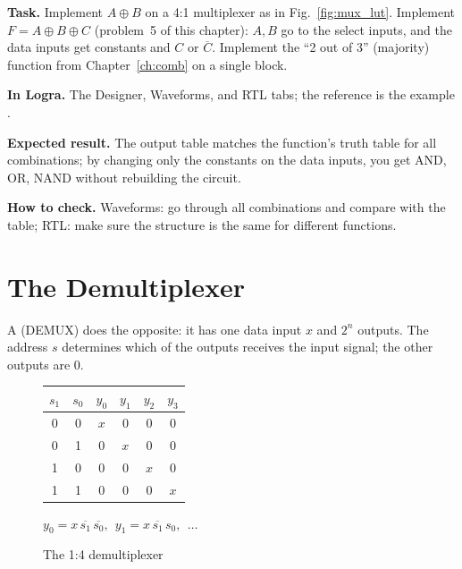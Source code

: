 \begin{diybox}
\textbf{Task.}  Implement $A\oplus B$ on a 4:1 multiplexer as in
Fig.~\ref{fig:mux_lut}.  Implement $F=A\oplus B\oplus C$ (problem~5 of
this chapter): $A,B$ go to the select inputs, and the data inputs get constants
and $C$ or $\overline{C}$.  Implement the ``2 out of 3'' (majority)
function from Chapter~\ref{ch:comb} on a single block.

\textbf{In Logra.} The Designer, Waveforms, and RTL tabs; the reference is the
example .

\textbf{Expected result.} The output table matches the function's truth table
for all combinations; by changing only the constants on the data inputs, you get
AND, OR, NAND without rebuilding the circuit.

\textbf{How to check.} Waveforms: go through all combinations and compare with
the table; RTL: make sure the structure is the same for different functions.
\end{diybox}

\section{The Demultiplexer}

A  (DEMUX) does the opposite: it has one data input $x$ and
$2^n$ outputs. The address $s$ determines which of the outputs receives the
input signal; the other outputs are 0.

\begin{figure}[H]
\centering
\begin{minipage}{0.35\textwidth}
\centering
{}
\end{minipage}\hfill
\begin{minipage}{0.6\textwidth}
\centering
\begin{tabular}{cc|cccc}
\toprule
$s_1$ & $s_0$ & $y_0$ & $y_1$ & $y_2$ & $y_3$ \\
\midrule
0 & 0 & $x$ & 0 & 0 & 0 \\
0 & 1 & 0 & $x$ & 0 & 0 \\
1 & 0 & 0 & 0 & $x$ & 0 \\
1 & 1 & 0 & 0 & 0 & $x$ \\
\bottomrule
\end{tabular}

\medskip
$y_0 = x\,\overline{s_1}\,\overline{s_0}, \ \ y_1 = x\,\overline{s_1}\,s_0, \ \ \ldots$
\end{minipage}
\caption{The 1:4 demultiplexer}
\end{figure}

